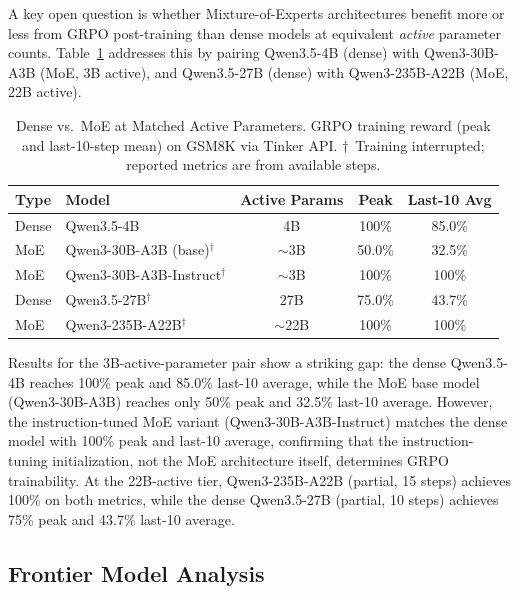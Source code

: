 \documentclass{article}
\begin{document}
A key open question is whether Mixture-of-Experts architectures benefit
more or less from GRPO post-training than dense models at equivalent
\emph{active} parameter counts. Table~\ref{tab:dense_moe} addresses this
by pairing Qwen3.5-4B (dense) with Qwen3-30B-A3B (MoE, 3B active),
and Qwen3.5-27B (dense) with Qwen3-235B-A22B (MoE, 22B active).

\begin{table}[htbp]
\centering
\caption{Dense vs.~MoE at Matched Active Parameters. GRPO training reward (peak and
last-10-step mean) on GSM8K via Tinker API.
$\dagger$~Training interrupted; reported metrics are from available steps.}
\label{tab:dense_moe}
\begin{tabular}{llccc}
\toprule
\textbf{Type} & \textbf{Model} & \textbf{Active Params} & \textbf{Peak} & \textbf{Last-10 Avg} \\
\midrule
Dense & Qwen3.5-4B & 4B & 100\% & 85.0\% \\
MoE & Qwen3-30B-A3B (base)$^\dagger$ & $\sim$3B & 50.0\% & 32.5\% \\
MoE & Qwen3-30B-A3B-Instruct$^\dagger$ & $\sim$3B & 100\% & 100\% \\
\midrule
Dense & Qwen3.5-27B$^\dagger$ & 27B & 75.0\% & 43.7\% \\
MoE & Qwen3-235B-A22B$^\dagger$ & $\sim$22B & 100\% & 100\% \\
\bottomrule
\end{tabular}
\end{table}

Results for the 3B-active-parameter pair show a striking gap: the dense
Qwen3.5-4B reaches 100\% peak and 85.0\% last-10 average, while the
MoE base model (Qwen3-30B-A3B) reaches only 50\% peak and 32.5\% last-10
average. However, the instruction-tuned MoE variant (Qwen3-30B-A3B-Instruct)
matches the dense model with 100\% peak and last-10 average, confirming that
the instruction-tuning initialization, not the MoE architecture itself,
determines GRPO trainability. At the 22B-active tier, Qwen3-235B-A22B
(partial, 15 steps) achieves 100\% on both metrics, while the dense
Qwen3.5-27B (partial, 10 steps) achieves 75\% peak and 43.7\% last-10 average.

\subsection{Frontier Model Analysis}
\label{sec:frontier}
\end{document}
